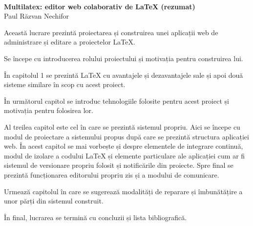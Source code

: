 \documentclass[a4wide,12pt]{report}
\begin{document}
\frenchspacing              %
\onehalfspace               %

\font=5.00pt     %
\font=2.00pt     %
\font=1.50pt     %
\font=0.00pt     %

\pagestyle{empty}

\begin{center}
    \mbox{}\\
    \vspace{1cm}
    {\Large{\textbf{Multilatex: editor web colaborativ de \LaTeX{} (rezumat)}}}\\
    \vspace{0.6cm}
    {\large{Paul Răzvan Nechifor}}\\
    \vspace{1cm}
\end{center}

Această lucrare prezintă proiectarea și construirea unei aplicații web de
administrare și editare a proiectelor \LaTeX{}.

Se începe cu introducerea rolului proiectului și motivația pentru construirea
lui.

În capitolul 1 se prezintă \LaTeX{} cu avantajele și dezavantajele sale și apoi
două sisteme similare în scop cu acest proiect.

În următorul capitol se introduc tehnologiile folosite pentru acest proiect și
motivația pentru folosirea lor.

Al treilea capitol este cel în care se prezintă sistemul propriu. Aici se începe
cu modul de proiectare a sistemului propus după care se prezintă structura
aplicației web. În acest capitol se mai vorbește și despre elementele de
integrare continuă, modul de izolare a codului \LaTeX{} și elemente particulare
ale aplicației cum ar fi sistemul de versionare propriu folosit și notificările
din proiecte. Spre final se prezintă funcționarea editorului propriu zis și a
modului de comunicare.

Urmează capitolul în care se sugerează modalități de reparare și îmbunătățire a
unor părți din sistemul construit.

În final, lucrarea se termină cu concluzii și lista bibliografică.

\vspace{0.6cm}
{\large{\textbf{}}}\\
\end{document}
